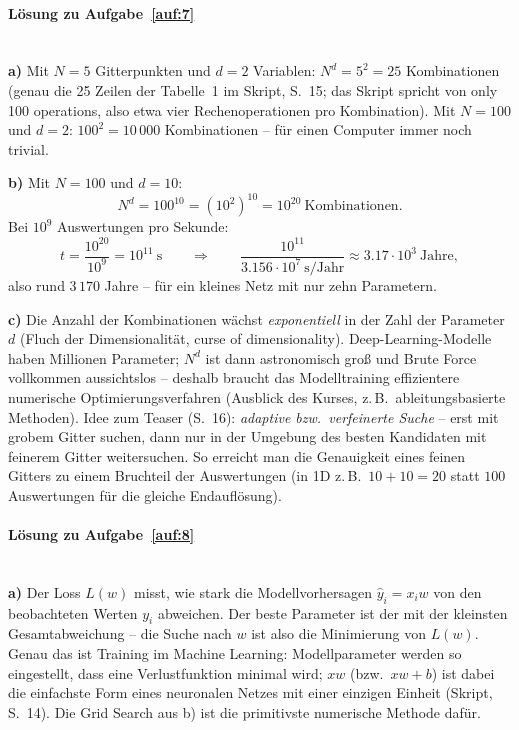 \documentclass[11pt,a4paper]{scrartcl}
\begin{document}
\paragraph{Lösung zu Aufgabe~\ref{auf:7}}\mbox{}\\[2pt]
\textbf{a)} Mit $N = 5$ Gitterpunkten und $d = 2$ Variablen:
$N^d = 5^2 = 25$ Kombinationen (genau die 25 Zeilen der Tabelle~1 im Skript, S.~15; das
Skript spricht von \glqq only 100 operations\grqq, also etwa vier Rechenoperationen pro
Kombination). Mit $N = 100$ und $d = 2$: $100^2 = 10\,000$ Kombinationen -- für einen
Computer immer noch trivial.

\textbf{b)} Mit $N = 100$ und $d = 10$:
\[
N^d = 100^{10} = (10^2)^{10} = 10^{20} \ \text{Kombinationen}.
\]
Bei $10^9$ Auswertungen pro Sekunde:
\[
t = \frac{10^{20}}{10^9} = 10^{11}\ \text{s}
\qquad\Rightarrow\qquad
\frac{10^{11}}{3.156 \cdot 10^7\ \text{s/Jahr}} \approx 3.17 \cdot 10^3\ \text{Jahre},
\]
also rund $3\,170$ Jahre -- für ein \glqq kleines\grqq{} Netz mit nur zehn Parametern.

\textbf{c)} Die Anzahl der Kombinationen wächst \emph{exponentiell} in der Zahl der
Parameter $d$ (Fluch der Dimensionalität, curse of dimensionality). Deep-Learning-Modelle
haben Millionen Parameter; $N^{d}$ ist dann astronomisch groß und Brute Force vollkommen
aussichtslos -- deshalb braucht das Modelltraining effizientere numerische
Optimierungsverfahren (Ausblick des Kurses, z.\,B.\ ableitungsbasierte Methoden).
Idee zum Teaser (S.~16): \emph{adaptive bzw.\ verfeinerte Suche} -- erst mit grobem Gitter
suchen, dann nur in der Umgebung des besten Kandidaten mit feinerem Gitter weitersuchen.
So erreicht man die Genauigkeit eines feinen Gitters zu einem Bruchteil der Auswertungen
(in 1D z.\,B.\ $10 + 10 = 20$ statt $100$ Auswertungen für die gleiche Endauflösung).

\paragraph{Lösung zu Aufgabe~\ref{auf:8}}\mbox{}\\[2pt]
\textbf{a)} Der Loss $L(w)$ misst, wie stark die Modellvorhersagen $\hat{y}_i = x_i w$ von
den beobachteten Werten $y_i$ abweichen. Der beste Parameter ist der mit der kleinsten
Gesamtabweichung -- die Suche nach $w$ ist also die Minimierung von $L(w)$. Genau das ist
Training im Machine Learning: Modellparameter werden so eingestellt, dass eine
Verlustfunktion minimal wird; $xw$ (bzw.\ $xw + b$) ist dabei die einfachste Form eines
neuronalen Netzes mit einer einzigen Einheit (Skript, S.~14). Die Grid Search aus b) ist
die primitivste numerische Methode dafür.
\end{document}
